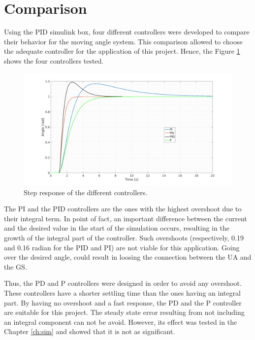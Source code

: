 \section{Comparison}
Using the PID simulink box, four different controllers were developed to compare their behavior for the moving angle system. This comparison allowed to choose the adequate controller for the application of this project. Hence, the Figure \ref{fig:comp_pid} shows the four controllers tested.

\begin{figure}[H]
\centerline{
\includegraphics[scale=0.35]{figures/full_comp.png}}
\caption{Step response of the different controllers.}
\label{fig:comp_pid}
\end{figure}

The PI and the PID controllers are the ones with the highest overshoot due to their integral term. In point of fact, an important difference between the current and the desired value in the start of the simulation occurs, resulting in the growth of the integral part of the controller. 
Such overshoots (respectively, 0.19 and 0.16 radian for the PID and PI) are not viable for this application. Going over the desired angle, could result in loosing the connection between the UA and the GS.

Thus, the PD and P controllers were designed in order to avoid any overshoot. These controllers have a shorter settling time than the ones having an integral part. By having no overshoot and a fast response, the PD and the P controller are suitable for this project. The steady state error resulting from not including an integral component can not be avoid. However, its effect was tested in the Chapter \ref{ch:sim} and showed that it is not as significant.

\vspace{5mm}

